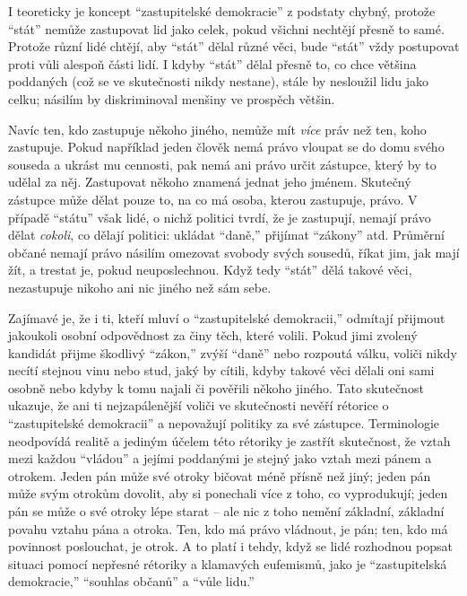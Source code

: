 \documentclass{book}
\begin{document}
I teoreticky je koncept \enquote{zastupitelské demokracie} z podstaty chybný, protože \enquote{stát} nemůže zastupovat lid jako celek, pokud všichni nechtějí přesně to samé. Protože různí lidé chtějí, aby \enquote{stát} dělal různé věci, bude \enquote{stát} vždy postupovat proti vůli alespoň části lidí. I kdyby \enquote{stát} dělal přesně to, co chce většina poddaných (což se ve skutečnosti nikdy nestane), stále by nesloužil lidu jako celku; násilím by diskriminoval menšiny ve prospěch většin.

Navíc ten, kdo zastupuje někoho jiného, nemůže mít \emph{více} práv než ten, koho zastupuje. Pokud například jeden člověk nemá právo vloupat se do domu svého souseda a ukrást mu cennosti, pak nemá ani právo určit zástupce, který by to udělal za něj. Zastupovat někoho znamená jednat jeho jménem. Skutečný zástupce může dělat pouze to, na co má osoba, kterou zastupuje, právo. V případě \enquote{státu} však lidé, o nichž politici tvrdí, že je zastupují, nemají právo dělat \emph{cokoli}, co dělají politici: ukládat \enquote{daně,} přijímat \enquote{zákony} atd. Průměrní občané nemají právo násilím omezovat svobody svých sousedů, říkat jim, jak mají žít, a trestat je, pokud neuposlechnou. Když tedy \enquote{stát} dělá takové věci, nezastupuje nikoho ani nic jiného než sám sebe.

Zajímavé je, že i ti, kteří mluví o \enquote{zastupitelské demokracii,} odmítají přijmout jakoukoli osobní odpovědnost za činy těch, které volili. Pokud jimi zvolený kandidát přijme škodlivý \enquote{zákon,} zvýší \enquote{daně} nebo rozpoutá válku, voliči nikdy necítí stejnou vinu nebo stud, jaký by cítili, kdyby takové věci dělali oni sami osobně nebo kdyby k tomu najali či pověřili někoho jiného. Tato skutečnost ukazuje, že ani ti nejzapálenější voliči ve skutečnosti nevěří rétorice o \enquote{zastupitelské demokracii} a nepovažují politiky za své zástupce. Terminologie neodpovídá realitě a jediným účelem této rétoriky je zastřít skutečnost, že vztah mezi každou \enquote{vládou} a jejími poddanými je stejný jako vztah mezi pánem a otrokem. Jeden pán může své otroky bičovat méně přísně než jiný; jeden pán může svým otrokům dovolit, aby si ponechali více z toho, co vyprodukují; jeden pán se může o své otroky lépe starat -- ale nic z toho nemění základní, základní povahu vztahu pána a otroka. Ten, kdo má právo vládnout, je pán; ten, kdo má povinnost poslouchat, je otrok. A to platí i tehdy, když se lidé rozhodnou popsat situaci pomocí nepřesné rétoriky a klamavých eufemismů, jako je \enquote{zastupitelská demokracie,} \enquote{souhlas občanů} a \enquote{vůle lidu.}
\end{document}
